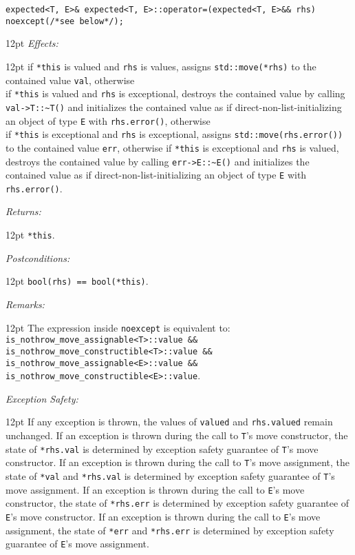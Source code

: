 \documentclass[a4paper,10pt]{article}
\newcommand{\cpp}[1]{\lstinline{#1}}
\newcommand{\wordingItem}[1]{\noindent\textit{#1:}}
\newenvironment{wordingTextItem}[1]{\wordingItem{#1}\vspace{7pt}\noindent\begin{adjustwidth}{12pt}{}}{\vspace{7pt}\end{adjustwidth}}
\newenvironment{wordingPara}{\begin{adjustwidth}{12pt}{}}{\end{adjustwidth}}
\begin{document}
\begin{lstlisting}[xleftmargin=0pt]
expected<T, E>& expected<T, E>::operator=(expected<T, E>&& rhs) noexcept(/*see below*/); 
\end{lstlisting}
\begin{wordingPara}
\begin{wordingTextItem}{Effects}
if \cpp{*this} is valued and \cpp{rhs} is values, assigns \cpp{std::move(*rhs)} to the contained value \cpp{val}, otherwise \\
if \cpp{*this} is valued and \cpp{rhs} is exceptional, destroys the contained value by calling \cpp{val->T::~T()} and  initializes the contained value as if direct-non-list-initializing an object of type \cpp{E} with \cpp{rhs.error()}, otherwise \\
if \cpp{*this} is exceptional and \cpp{rhs} is exceptional, assigns \cpp{std::move(rhs.error())} to the contained value \cpp{err}, otherwise  
if \cpp{*this} is exceptional and \cpp{rhs} is valued, destroys the contained value by calling \cpp{err->E::~E()} and  initializes the contained value as if direct-non-list-initializing an object of type \cpp{E} with \cpp{rhs.error()}.
\end{wordingTextItem}
\begin{wordingTextItem}{Returns}
\cpp{*this}.
\end{wordingTextItem}
\begin{wordingTextItem}{Postconditions}
\cpp{bool(rhs) == bool(*this)}.
\end{wordingTextItem}
\begin{wordingTextItem}{Remarks}
The expression inside \cpp{noexcept} is equivalent to:\\
\cpp{is_nothrow_move_assignable<T>::value &&}\\
\cpp{is_nothrow_move_constructible<T>::value &&}\\
\cpp{is_nothrow_move_assignable<E>::value &&}\\
\cpp{is_nothrow_move_constructible<E>::value}.
\end{wordingTextItem}
\begin{wordingTextItem}{Exception Safety}
If any exception is thrown, the values of \cpp{valued} and \cpp{rhs.valued} remain unchanged. If an exception is thrown during the call to \cpp{T}'s move constructor, the state of \cpp{*rhs.val} is determined by exception safety guarantee of \cpp{T}'s move constructor. If an exception is thrown during the call to \cpp{T}'s move assignment, the state of \cpp{*val} and \cpp{*rhs.val} is determined by exception safety guarantee of \cpp{T}'s move assignment. If an exception is thrown during the call to \cpp{E}'s move constructor, the state of \cpp{*rhs.err} is determined by exception safety guarantee of \cpp{E}'s move constructor. If an exception is thrown during the call to \cpp{E}'s move assignment, the state of \cpp{*err} and \cpp{*rhs.err} is determined by exception safety guarantee of \cpp{E}'s move assignment.

\end{wordingTextItem}
\end{wordingPara}
\end{document}

